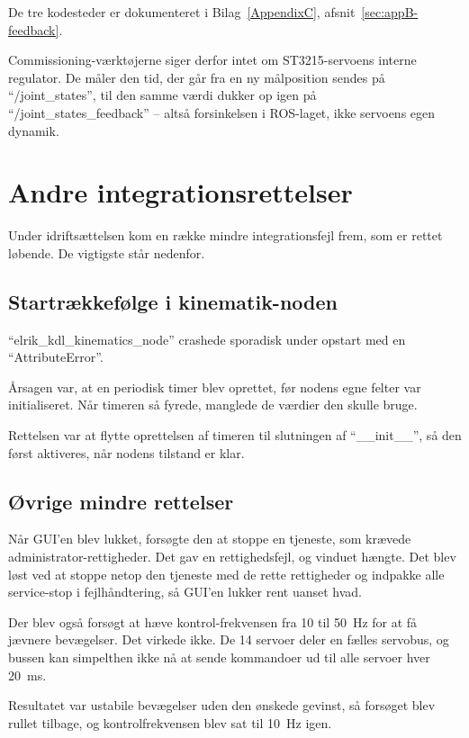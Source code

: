 De tre kodesteder er dokumenteret i Bilag~\ref{AppendixC},
afsnit~\ref{sec:appB-feedback}.

Commissioning-værktøjerne siger derfor intet om ST3215-servoens
interne regulator. De måler den tid, der går fra en ny målposition
sendes på \enquote{/joint\_states}, til den samme værdi dukker op
igen på \enquote{/joint\_states\_feedback} -- altså forsinkelsen i
ROS-laget, ikke servoens egen dynamik.

\section{Andre integrationsrettelser}

Under idriftsættelsen kom en række mindre integrationsfejl frem,
som er rettet løbende. De vigtigste står nedenfor.

\subsection{Startrækkefølge i kinematik-noden}

\enquote{elrik\_kdl\_kinematics\_node} crashede sporadisk under
opstart med en \enquote{AttributeError}.

Årsagen var, at en periodisk timer blev oprettet, før nodens egne
felter var initialiseret. Når timeren så fyrede, manglede de værdier
den skulle bruge.

Rettelsen var at flytte oprettelsen af timeren til slutningen af
\enquote{\_\_init\_\_}, så den først aktiveres, når nodens tilstand
er klar.

\clearpage
\subsection{Øvrige mindre rettelser}

Når GUI'en blev lukket, forsøgte den at stoppe en tjeneste, som
krævede administrator-rettigheder. Det gav en rettighedsfejl, og
vinduet hængte. Det blev løst ved at stoppe netop den tjeneste med
de rette rettigheder og indpakke alle service-stop i
fejlhåndtering, så GUI'en lukker rent uanset hvad.

Der blev også forsøgt at hæve kontrol-frekvensen fra 10 til 50~Hz for at
få jævnere bevægelser. Det virkede ikke. De 14 servoer deler en
fælles servobus, og bussen kan simpelthen ikke nå at sende
kommandoer ud til alle servoer hver 20~ms.

Resultatet var ustabile bevægelser uden den ønskede gevinst, så
forsøget blev rullet tilbage, og kontrolfrekvensen blev sat til
10~Hz igen.

